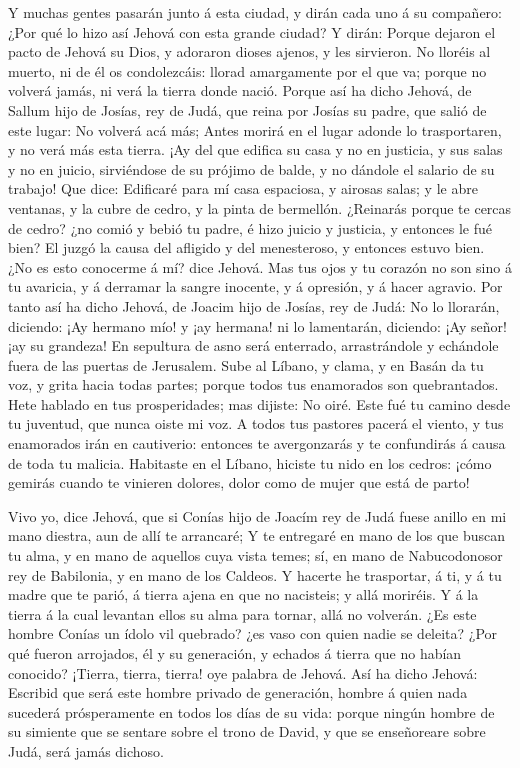  Y muchas gentes pasarán junto á esta ciudad, y dirán cada
uno á su compañero: ¿Por qué lo hizo así Jehová con esta grande ciudad?
 Y dirán: Porque dejaron el pacto de Jehová su Dios, y
adoraron dioses ajenos, y les sirvieron.  No lloréis al
muerto, ni de él os condolezcáis: llorad amargamente por el que va;
porque no volverá jamás, ni verá la tierra donde nació. 
Porque así ha dicho Jehová, de Sallum hijo de Josías, rey de Judá, que
reina por Josías su padre, que salió de este lugar: No volverá acá más;
 Antes morirá en el lugar adonde lo trasportaren, y no verá
más esta tierra.  ¡Ay del que edifica su casa y no en
justicia, y sus salas y no en juicio, sirviéndose de su prójimo de
balde, y no dándole el salario de su trabajo!  Que dice:
Edificaré para mí casa espaciosa, y airosas salas; y le abre ventanas, y
la cubre de cedro, y la pinta de bermellón.  ¿Reinarás
porque te cercas de cedro? ¿no comió y bebió tu padre, é hizo juicio y
justicia, y entonces le fué bien?  El juzgó la causa del
afligido y del menesteroso, y entonces estuvo bien. ¿No es esto
conocerme á mí? dice Jehová.  Mas tus ojos y tu corazón no
son sino á tu avaricia, y á derramar la sangre inocente, y á opresión, y
á hacer agravio.  Por tanto así ha dicho Jehová, de Joacim
hijo de Josías, rey de Judá: No lo llorarán, diciendo: ¡Ay hermano mío!
y ¡ay hermana! ni lo lamentarán, diciendo: ¡Ay señor! ¡ay su grandeza!
 En sepultura de asno será enterrado, arrastrándole y
echándole fuera de las puertas de Jerusalem.  Sube al
Líbano, y clama, y en Basán da tu voz, y grita hacia todas partes;
porque todos tus enamorados son quebrantados.  Hete hablado
en tus prosperidades; mas dijiste: No oiré. Este fué tu camino desde tu
juventud, que nunca oiste mi voz.  A todos tus pastores
pacerá el viento, y tus enamorados irán en cautiverio: entonces te
avergonzarás y te confundirás á causa de toda tu malicia. 
Habitaste en el Líbano, hiciste tu nido en los cedros: ¡cómo gemirás
cuando te vinieren dolores, dolor como de mujer que está de parto!

 Vivo yo, dice Jehová, que si Conías hijo de Joacím rey de
Judá fuese anillo en mi mano diestra, aun de allí te arrancaré;
 Y te entregaré en mano de los que buscan tu alma, y en
mano de aquellos cuya vista temes; sí, en mano de Nabucodonosor rey de
Babilonia, y en mano de los Caldeos.  Y hacerte he
trasportar, á ti, y á tu madre que te parió, á tierra ajena en que no
nacisteis; y allá moriréis.  Y á la tierra á la cual
levantan ellos su alma para tornar, allá no volverán.  ¿Es
este hombre Conías un ídolo vil quebrado? ¿es vaso con quien nadie se
deleita? ¿Por qué fueron arrojados, él y su generación, y echados á
tierra que no habían conocido?  ¡Tierra, tierra, tierra!
oye palabra de Jehová.  Así ha dicho Jehová: Escribid que
será este hombre privado de generación, hombre á quien nada sucederá
prósperamente en todos los días de su vida: porque ningún hombre de su
simiente que se sentare sobre el trono de David, y que se enseñoreare
sobre Judá, será jamás dichoso.

